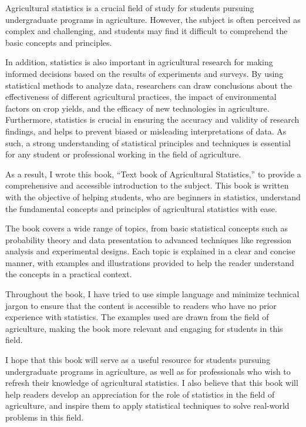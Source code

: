 \documentclass[
]{book}
\begin{document}
Agricultural statistics is a crucial field of study for students pursuing undergraduate programs in agriculture. However, the subject is often perceived as complex and challenging, and students may find it difficult to comprehend the basic concepts and principles.

In addition, statistics is also important in agricultural research for making informed decisions based on the results of experiments and surveys. By using statistical methods to analyze data, researchers can draw conclusions about the effectiveness of different agricultural practices, the impact of environmental factors on crop yields, and the efficacy of new technologies in agriculture. Furthermore, statistics is crucial in ensuring the accuracy and validity of research findings, and helps to prevent biased or misleading interpretations of data. As such, a strong understanding of statistical principles and techniques is essential for any student or professional working in the field of agriculture.

As a result, I wrote this book, ``Text book of Agricultural Statistics,'' to provide a comprehensive and accessible introduction to the subject. This book is written with the objective of helping students, who are beginners in statistics, understand the fundamental concepts and principles of agricultural statistics with ease.

The book covers a wide range of topics, from basic statistical concepts such as probability theory and data presentation to advanced techniques like regression analysis and experimental designs. Each topic is explained in a clear and concise manner, with examples and illustrations provided to help the reader understand the concepts in a practical context.

Throughout the book, I have tried to use simple language and minimize technical jargon to ensure that the content is accessible to readers who have no prior experience with statistics. The examples used are drawn from the field of agriculture, making the book more relevant and engaging for students in this field.

I hope that this book will serve as a useful resource for students pursuing undergraduate programs in agriculture, as well as for professionals who wish to refresh their knowledge of agricultural statistics. I also believe that this book will help readers develop an appreciation for the role of statistics in the field of agriculture, and inspire them to apply statistical techniques to solve real-world problems in this field.
\end{document}
